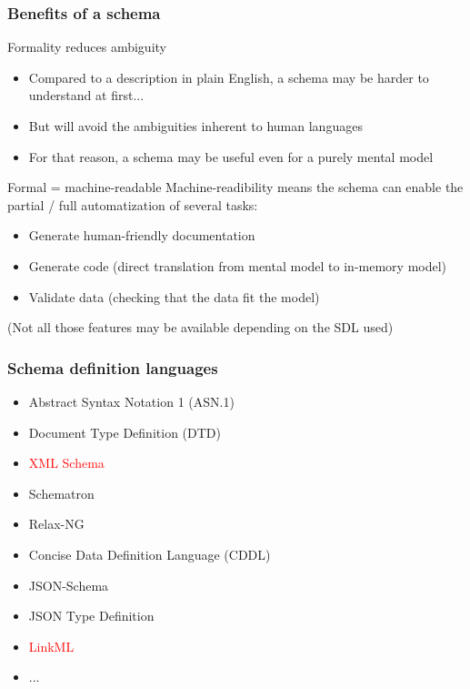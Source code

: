 \begin{frame}
  \frametitle{Benefits of a schema}

  \begin{block}{Formality reduces ambiguity}
    \begin{itemize}
      \item Compared to a description in plain English, a schema may be harder
            to understand at first...
      \item But will avoid the ambiguities inherent to human languages
      \item For that reason, a schema may be useful even for a purely mental
            model
    \end{itemize}
  \end{block}

  \begin{block}{Formal = machine-readable}
    Machine-readibility means the schema can enable the partial / full
    automatization of several tasks:
    \begin{itemize}
      \item Generate human-friendly documentation
      \item Generate code (direct translation from mental model to in-memory model)
      \item Validate data (checking that the data fit the model)
    \end{itemize}
    (Not all those features may be available depending on the SDL used)
  \end{block}
\end{frame}

\begin{frame}
  \frametitle{Schema definition languages}

  \begin{itemize}
    \item Abstract Syntax Notation 1 (ASN.1)
    \item Document Type Definition (DTD)
    \item \textcolor<2>{red}{XML Schema}
    \item Schematron
    \item Relax-NG
    \item Concise Data Definition Language (CDDL)
    \item JSON-Schema
    \item JSON Type Definition
    \item \textcolor<2>{red}{LinkML}
    \item ...
  \end{itemize}
\end{frame}

